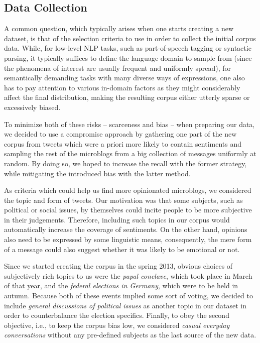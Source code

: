 \subsection{Data Collection}

A common question, which typically arises when one starts creating a
new dataset, is that of the selection criteria to use in order to
collect the initial corpus data.  While, for low-level NLP tasks, such
as part-of-speech tagging or syntactic parsing, it typically suffices
to define the language domain to sample from (since the phenomena of
interest are usually frequent and uniformly spread), for semantically
demanding tasks with many diverse ways of expressions, one also has to
pay attention to various in-domain factors as they might considerably
affect the final distribution, making the resulting corpus either
utterly sparse or excessively biased.

To minimize both of these risks -- scarceness and bias -- when
preparing our data, we decided to use a compromise approach by
gathering one part of the new corpus from tweets which were a priori
more likely to contain sentiments and sampling the rest of the
microblogs from a big collection of messages uniformly at random.  By
doing so, we hoped to increase the recall with the former strategy,
while mitigating the introduced bias with the latter method.

As criteria which could help us find more opinionated microblogs, we
considered the topic and form of tweets.  Our motivation was that some
subjects, such as political or social issues, by themselves could
incite people to be more subjective in their judgements.  Therefore,
including such topics in our corpus would automatically increase the
coverage of sentiments.  On the other hand, opinions also need to be
expressed by some linguistic means, consequently, the mere form of a
message could also suggest whether it was likely to be emotional or
not.

Since we started creating the corpus in the spring 2013, obvious
choices of subjectively rich topics to us were the \emph{papal
  conclave}, which took place in March of that year, and the
\emph{federal elections in Germany}, which were to be held in autumn.
Because both of these events implied some sort of voting, we decided
to include \emph{general discussions of political issues} as another
topic in our dataset in order to counterbalance the election
specifics.  Finally, to obey the second objective, i.e., to keep the
corpus bias low, we considered \emph{casual everyday conversations}
without any pre-defined subjects as the last source of the new data.

